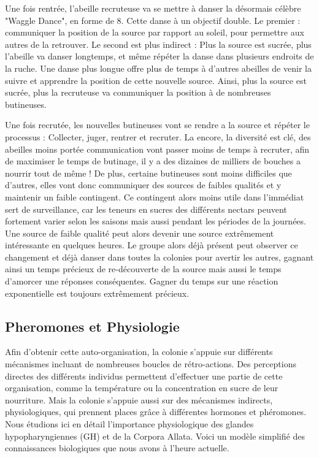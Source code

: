 			Une fois rentrée, l'abeille recruteuse va se mettre à danser la désormais célèbre "Waggle Dance", en forme de 8. Cette danse à un objectif double. Le premier : communiquer la position de la source par rapport au soleil, pour permettre aux autres de la retrouver. Le second est plus indirect : Plus la source est sucrée, plus l'abeille va danser longtemps, et même répéter la danse dans plusieurs endroits de la ruche. Une danse plus longue offre plus de temps à d'autres abeilles de venir la suivre et apprendre la position de cette nouvelle source. Ainsi, plus la source est sucrée, plus la recruteuse va communiquer la position à de nombreuses butineuses.
			
			Une fois recrutée, les nouvelles butineuses vont se rendre a la source et répéter le processus : Collecter, juger, rentrer et recruter. La encore, la diversité est clé, des abeilles moins portée communication vont passer moins de temps à recruter, afin de maximiser le temps de butinage, il y a des dizaines de milliers de bouches a nourrir tout de même ! De plus, certaine butineuses sont moins difficiles que d'autres, elles vont donc communiquer des sources de faibles qualités et y maintenir un faible contingent. Ce contingent alors moins utile dans l'immédiat sert de surveillance, car les teneurs en sucres des différents nectars peuvent fortement varier selon les saisons mais aussi pendant les périodes de la journées. Une source de faible qualité peut alors devenir une source extrêmement intéressante en quelques heures. Le groupe alors déjà présent peut observer ce changement et déjà danser dans toutes la colonies pour avertir les autres, gagnant ainsi un temps précieux de re-découverte de la source mais aussi le temps d'amorcer une réponses conséquentes. Gagner du temps sur une réaction exponentielle est toujours extrêmement précieux.
		\subsection{Pheromones et Physiologie}
			Afin d'obtenir cette auto-organisation, la colonie s'appuie sur différents mécanismes incluant de nombreuses boucles de rétro-actions. Des perceptions directes des différents individus permettent d'effectuer une partie de cette organisation, comme la température ou la concentration en sucre de leur nourriture. Mais la colonie s'appuie aussi sur des mécanismes indirects, physiologiques, qui prennent places grâce à différentes hormones et phéromones. Nous étudions ici en détail l'importance physiologique des glandes hypopharyngiennes (GH) et de la Corpora Allata. Voici un modèle simplifié des connaissances biologiques que nous avons à l'heure actuelle.
			
